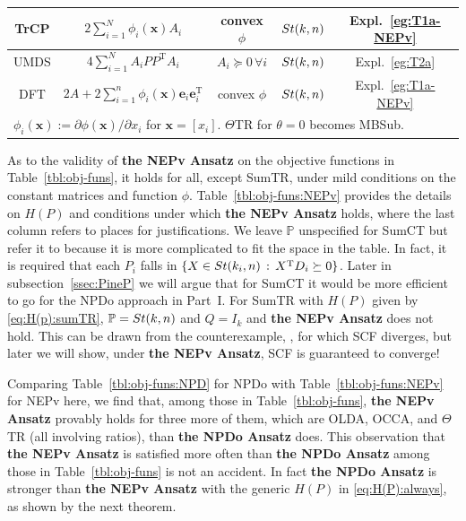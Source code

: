 \documentclass[11pt]{article}
\def\be{\pmb{e}}
\def\bx{\pmb{x}}
\def\bbP{\mathbb{P}}
\newcommand\STM[2]{{\rm St}(#1,#2)}
\DeclareMathOperator{\T}{T}
\theoremstyle{definition}
\numberwithin{equation}{section}
\begin{document}
\begin{table}[t]
{\begin{tabular}{|c|c|c|c|c|}
TrCP & $2\sum_{i=1}^N\phi_i(\bx)A_i$ & convex $\phi$ & $\STM{k}{n}$ & Expl.~\ref{eg:T1a-NEPv}  \\ \hline
UMDS & $4\sum_{i=1}^NA_iPP^{\T}A_i$ & $A_i\succeq 0\,\forall i$ & $\STM{k}{n}$ & Expl.~\ref{eg:T2a}  \\ \hline
DFT & $2A+2\sum_{i=1}^n\phi_i(\bx)\be_i\be_i^{\T}$ & convex $\phi$  & $\STM{k}{n}$ & Expl.~\ref{eg:T1a-NEPv} \\
  \hline
\multicolumn{5}{l}{\small * $\phi_i(\bx):=\partial\phi(\bx)/\partial x_i$  for $\bx=[x_i]$.
                   $\Theta$TR for $\theta=0$ becomes MBSub.} \\
\end{tabular}
}
\end{table}
As to the validity of  {\bf the NEPv Ansatz} on the objective functions in Table~\ref{tbl:obj-funs},
it holds for all, except SumTR,  under mild conditions on the constant matrices and function $\phi$.
Table~\ref{tbl:obj-funs:NEPv}
provides the details on $H(P)$ and conditions under which
{\bf the NEPv Ansatz} holds, where the last column refers to places for justifications.
We leave $\bbP$ unspecified for SumCT but refer it to \cite{wazl:2022a} because it is more complicated to fit the space in the table.
In fact, it is required that
each $P_i$ falls in $\{X\in\STM{k_i}{n}\,:\, X^{\T}D_i\succeq 0\}$. Later in subsection~\ref{ssec:PineP} we will argue that for SumCT it would be more efficient
to go for the NPDo approach in Part~I.
        For  SumTR with $H(P)$ given by
        \eqref{eq:H(p):sumTR},  $\bbP=\STM{k}{n}$ and $Q=I_k$ and {\bf the NEPv Ansatz} does not hold.
        This can be drawn from the counterexample, \cite[Example 4.1]{zhli:2014b}, for which SCF diverges,
        but later we will show, under {\bf the NEPv Ansatz}, SCF is guaranteed to converge!


Comparing Table~\ref{tbl:obj-funs:NPD} for  NPDo  with Table~\ref{tbl:obj-funs:NEPv} for NEPv here, we find that,
among those in Table~\ref{tbl:obj-funs},
{\bf the NEPv Ansatz}  provably holds for three more of them, which are OLDA, OCCA, and $\Theta$TR (all involving ratios), than {\bf the NPDo Ansatz} does. This observation that {\bf the NEPv Ansatz} is satisfied more often than
{\bf the NPDo Ansatz} among those in Table~\ref{tbl:obj-funs} is not an accident.
In fact {\bf the NPDo Ansatz} is stronger than {\bf the NEPv Ansatz} with
the generic $H(P)$ in \eqref{eq:H(P):always},
as shown by the next theorem.
\end{document}
